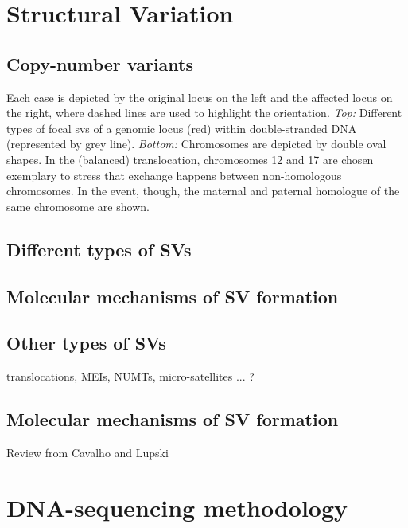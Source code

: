 \section{Structural Variation}
\label{sec:sv}

\subsection{Copy-number variants}

    {Each case is depicted by the original locus on the left and the affected
    locus on the right, where dashed lines are used to highlight the orientation.
    \textit{Top:} Different types of focal \acp{sv} of a genomic locus (red)
    within double-stranded DNA (represented by grey line).  \textit{Bottom:}
    Chromosomes are depicted by double oval shapes. In the (balanced)
    translocation, chromosomes 12 and 17 are chosen exemplary to stress that
    exchange happens between non-homologous chromosomes. In the \loh event,
    though, the maternal and paternal homologue of the same chromosome are
    shown.}


\subsection{Different types of SVs}
\label{sec:sv_classes}

\subsection{Molecular mechanisms of SV formation}
\label{sec:mechanisms}

\subsection{Other types of SVs}
translocations, MEIs, NUMTs, micro-satellites  ... ?

\subsection{Molecular mechanisms of SV formation}
\label{sec:mechanisms}

Review from Cavalho and  Lupski \citep{Carvalho2016}



\section{DNA-sequencing methodology}

